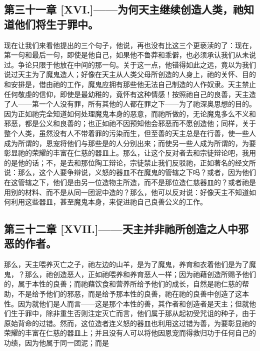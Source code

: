 
\subsection{第三十一章 [XVI.]——为何天主继续创造人类，祂知道他们将生于罪中。}

现在让我们来看他提出的三个句子，他说，再也没有比这三个更亵渎的了：现在，第一句和最后一句，即使是他自己，如果他不鲁莽和乖僻，也必须承认我们从未说过。争论只限于他放在中间的那一句。关于这一点，他错得如此之远，竟以为我们说过天主为了魔鬼造人；好像在天主从人类父母所创造的人身上，祂的关怀、目的和安排是，借由祂的工作，魔鬼应拥有那些他无法自己制造的人作奴隶。天主禁止任何敬虔的信仰，即使是最幼稚的，竟怀有这种情感！按照祂自己的良善，天主造了人——第一个人没有罪，所有其他的人都在罪之下——为了祂深奥思想的目的。因为正如祂完全知道如何处理魔鬼本身的恶意，而祂所做的，无论魔鬼多么不义和邪恶，都是公义和良善的；也正如祂不因预知他会邪恶而不愿创造他；同样，关于整个人类，虽然没有人不带着罪的污染而生，但至善的天主总是在行善，使一些人成为所谓的，恩宠将他们与那些是的人分别出来；而使另一些人成为所谓的，为要彰显祂的荣耀的丰富在仁慈的器皿上。那么，让这个反对者去和宗徒辩论吧，我用的是他的话；不，是去和那位陶工辩论，宗徒禁止我们反驳祂，正如著名的经文所说：那么，这个人要争辩说，义怒的器皿不在魔鬼的管辖之下吗？或者，因为他们在这管辖之下，他们是由另一位造物主所造，而不是那位造仁慈器皿的？或者祂是用别的材料、而不是从同一团泥中造的？那么，他可以反对说：好像天主不知道如何利用这些器皿，甚至魔鬼本身，来促进祂自己良善公义的工作。\par


\subsection{第三十二章 [XVII.]——天主并非祂所创造之人中邪恶的作者。}

那么，天主喂养灭亡之子，祂左边的山羊，是为了魔鬼，养育和衣着他们是为了魔鬼，？那么，祂创造恶人，正如祂喂养和养育恶人一样；因为祂藉创造所赐予他们的，属于本性的良善；而祂藉饮食和营养所给予他们的成长，自然是祂仁慈的帮助，不是给予他们的邪恶，而是给予那本性的良善，祂在祂的良善中创造了这本性。因为就他们是人而言——这是那个本性的善，其作者和创造者是天主；但就他们生于罪中，除非重生否则注定灭亡而言，他们属于那从起初受咒诅的种子，由于原始背命的过错。然而，这位造者连义怒的器皿也利用这过错为善，为要彰显祂的荣耀的丰富在仁慈的器皿上；并且没有人可以将他因恩宠而得救归功于任何自己的功绩，因为他属于同一团泥；而是\par


